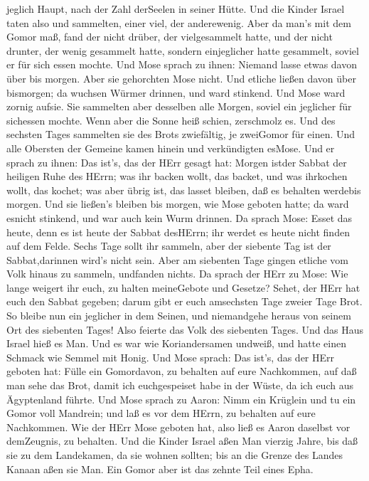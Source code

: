 jeglich Haupt, nach der Zahl derSeelen in seiner Hütte. 
Und die Kinder Israel taten also und sammelten, einer viel, der
anderewenig.  Aber da man's mit dem Gomor maß, fand der
nicht drüber, der vielgesammelt hatte, und der nicht drunter, der wenig
gesammelt hatte, sondern einjeglicher hatte gesammelt, soviel er für
sich essen mochte.  Und Mose sprach zu ihnen: Niemand lasse
etwas davon über bis morgen.  Aber sie gehorchten Mose
nicht. Und etliche ließen davon über bismorgen; da wuchsen Würmer
drinnen, und ward stinkend. Und Mose ward zornig aufsie. 
Sie sammelten aber desselben alle Morgen, soviel ein jeglicher für
sichessen mochte. Wenn aber die Sonne heiß schien, zerschmolz es.
 Und des sechsten Tages sammelten sie des Brots zwiefältig,
je zweiGomor für einen. Und alle Obersten der Gemeine kamen hinein und
verkündigten esMose.  Und er sprach zu ihnen: Das ist's,
das der HErr gesagt hat: Morgen istder Sabbat der heiligen Ruhe des
HErrn; was ihr backen wollt, das backet, und was ihrkochen wollt, das
kochet; was aber übrig ist, das lasset bleiben, daß es behalten werdebis
morgen.  Und sie ließen's bleiben bis morgen, wie Mose
geboten hatte; da ward esnicht stinkend, und war auch kein Wurm drinnen.
 Da sprach Mose: Esset das heute, denn es ist heute der
Sabbat desHErrn; ihr werdet es heute nicht finden auf dem Felde.
 Sechs Tage sollt ihr sammeln, aber der siebente Tag ist
der Sabbat,darinnen wird's nicht sein.  Aber am siebenten
Tage gingen etliche vom Volk hinaus zu sammeln, undfanden nichts.
 Da sprach der HErr zu Mose: Wie lange weigert ihr euch, zu
halten meineGebote und Gesetze?  Sehet, der HErr hat euch
den Sabbat gegeben; darum gibt er euch amsechsten Tage zweier Tage Brot.
So bleibe nun ein jeglicher in dem Seinen, und niemandgehe heraus von
seinem Ort des siebenten Tages!  Also feierte das Volk des
siebenten Tages.  Und das Haus Israel hieß es Man. Und es
war wie Koriandersamen undweiß, und hatte einen Schmack wie Semmel mit
Honig.  Und Mose sprach: Das ist's, das der HErr geboten
hat: Fülle ein Gomordavon, zu behalten auf eure Nachkommen, auf daß man
sehe das Brot, damit ich euchgespeiset habe in der Wüste, da ich euch
aus Ägyptenland führte.  Und Mose sprach zu Aaron: Nimm ein
Krüglein und tu ein Gomor voll Mandrein; und laß es vor dem HErrn, zu
behalten auf eure Nachkommen.  Wie der HErr Mose geboten
hat, also ließ es Aaron daselbst vor demZeugnis, zu behalten.
 Und die Kinder Israel aßen Man vierzig Jahre, bis daß sie
zu dem Landekamen, da sie wohnen sollten; bis an die Grenze des Landes
Kanaan aßen sie Man.  Ein Gomor aber ist das zehnte Teil
eines Epha.

